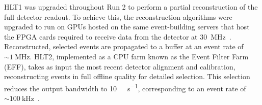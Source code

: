 HLT1 was upgraded throughout Run 2 to perform a partial reconstruction of the full detector readout. To achieve this, the reconstruction algorithms were upgraded to run on GPUs hosted on the same event-building servers that host the FPGA cards required to receive data from the detector at \SI{30}{\mega\hertz}~\cite{LHCb_Allen_GPU}. Reconstructed, selected events are propagated to a buffer at an event rate of ${\sim}\SI{1}{\mega\hertz}$. HLT2, implemented as a CPU farm known as the Event Filter Farm (EFF), takes as input the most recent detector alignment and calibration, reconstructing events in full offline quality for detailed selection. This selection reduces the output bandwidth to \SI{10}{\giga\byte\per\second}, corresponding to an event rate of $\sim\SI{100}{\kilo\hertz}$~\cite{lhcb_hlt2_storage_run3}.

